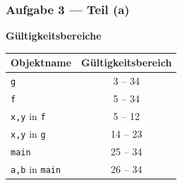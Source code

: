 \documentclass{beamer}
\begin{document}
\begin{frame} \frametitle{Aufgabe 3 --- Teil (a)}
	\textbf{Gültigkeitsbereiche}

	\centering
	\begin{tabular}{|l|c|}
		\hline
		Objektname & Gültigkeitsbereich \\ \hline \hline
		\texttt{g} & 3 -- 34 \\ \hline
		\texttt{f} & 5 -- 34 \\ \hline
		\texttt{x,y} in \texttt{f} & 5 -- 12 \\ \hline
		\texttt{x,y} in \texttt{g} & 14 -- 23 \\ \hline
		\texttt{main} & 25 -- 34 \\ \hline
		\texttt{a,b} in \texttt{main} & 26 -- 34 \\ \hline
	\end{tabular}
\end{frame}
\end{document}

